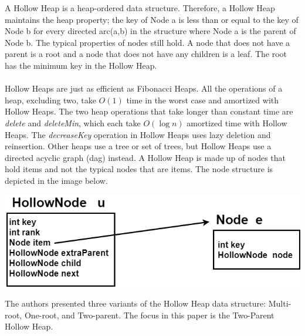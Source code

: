 \documentclass[letter,10pt]{article}
\begin{document}
\qquad A Hollow Heap is a heap-ordered data structure. Therefore, a Hollow Heap maintains the heap property; the key of Node a is less than or equal to the key of Node b for every directed arc(a,b) in the structure where Node a is the parent of Node b. The typical properties of nodes still hold. A node that does not have a parent is a root and a node that does not have any children is a leaf. The root has the minimum key in the Hollow Heap.\\\\
Hollow Heaps are just as efficient as Fibonacci Heaps. All the operations of a heap, excluding two, take $O(1)$ time in the worst case and amortized with Hollow Heaps. The two heap operations that take longer than constant time are \textit{delete} and \textit{deleteMin}, which each take $O(\log n)$ amortized time with Hollow Heaps. The \textit{decreaseKey} operation in Hollow Heaps uses lazy deletion and reinsertion. Other heaps use a tree or set of trees, but Hollow Heaps use a directed acyclic graph (dag) instead. A Hollow Heap is made up of nodes that hold items and not the typical nodes that are items. The node structure is depicted in the image below.
\begin{center}
	\includegraphics[scale=.5]{one.png}
\end{center}
The authors presented three variants of the Hollow Heap data structure: Multi-root, One-root, and Two-parent. The focus in this paper is the Two-Parent Hollow Heap.  
\end{document}
